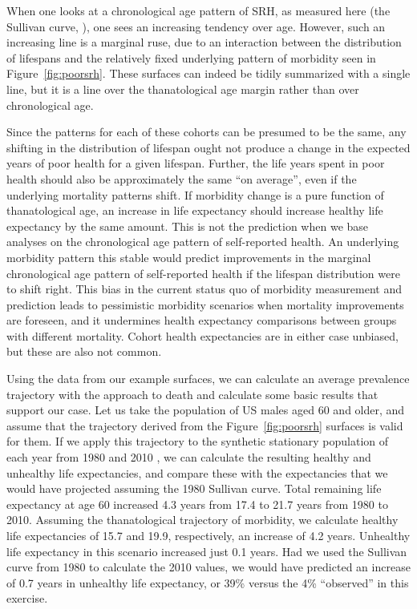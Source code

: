 \documentclass[12pt,oneside,a4paper]{article} %
\begin{document}
When one looks at a chronological age pattern of SRH, as measured
here (the Sullivan curve, \citep{Sullivan1970}), one sees an increasing tendency
over age.
However, such an increasing line is a marginal ruse, due to an interaction
between the distribution of lifespans and the relatively fixed underlying
pattern of morbidity seen in Figure~\ref{fig:poorsrh}. These surfaces can indeed
be tidily summarized with a single line, but it is a line over the
thanatological age margin rather than over chronological age. 

Since the patterns for each of these cohorts can be presumed to be the same, any
shifting in the distribution of lifespan ought not produce a change in the
expected years of poor health for a given lifespan. Further, the life years
spent in poor health should also be approximately the same ``on average'', even
if the underlying mortality patterns shift. If morbidity change is a pure
function of thanatological age, an increase in life expectancy should increase
healthy life expectancy by the same amount. This is not the prediction when we
base analyses on the chronological age pattern of self-reported health. An
underlying morbidity pattern this stable would predict improvements in the
marginal chronological age pattern of self-reported health if the lifespan
distribution were to shift right. This bias in the current status quo of
morbidity measurement and prediction leads to pessimistic morbidity scenarios
when mortality improvements are foreseen, and it undermines health expectancy
comparisons between groups with different mortality. Cohort health expectancies
are in either case unbiased, but these are also not common.

Using the data from our example surfaces, we can calculate an average prevalence
trajectory with the approach to death and calculate some basic results that
support our case. Let us take the population of US males aged 60 and older, and
assume that the trajectory derived from the Figure~\ref{fig:poorsrh} surfaces
is valid for them.
If we apply this trajectory to the synthetic stationary population of each
year from 1980 and 2010 \citep{HMD}, we can calculate the resulting healthy and
unhealthy life expectancies, and compare these with the expectancies that we would have projected assuming the 1980 Sullivan curve.
Total remaining life expectancy at age 60 increased 4.3 years from 17.4 to 21.7
years from 1980 to 2010. Assuming the thanatological trajectory of
morbidity, we calculate healthy life expectancies of 15.7 and 19.9,
respectively, an increase of 4.2 years. Unhealthy life expectancy in this
scenario increased just 0.1 years. Had we used the Sullivan curve from 1980 to
calculate the 2010 values, we would have predicted an increase of 0.7 years in
unhealthy life expectancy, or 39\% versus the 4\% ``observed'' in this
exercise.
\end{document}
